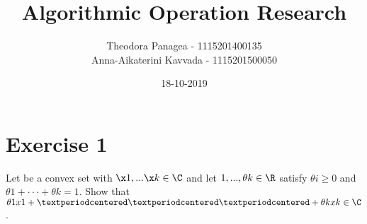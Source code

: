 \documentclass[10pt]{article}
\title{Algorithmic Operation Research}
\date{18-10-2019}
\author{Theodora Panagea - 1115201400135 \\ Anna-Aikaterini Kavvada - 1115201500050}
\begin{document}
	\maketitle{}
  	\section{Exercise 1}
  	Let be a convex set with $\x 1 , . . . \x k \in \C$ and let $1 , . . . , \theta k \in \R$ satisfy $\theta i \geq 0$ and
$\theta 1 + · · · + \theta k = 1$. Show that $\theta 1 x 1 + · · · + \theta k x k \in \C$.
\end{document}
